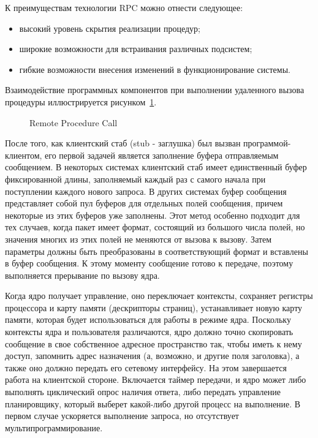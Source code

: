 К преимуществам технологии RPC
можно отнести следующее:
\begin{itemize}
  \item высокий уровень скрытия реализации процедур;
  \item широкие возможности для
встраивания различных подсистем;
\item гибкие возможности внесения изменений в
функционирование системы.
\end{itemize}

Взаимодействие программных компонентов при выполнении удаленного вызова
процедуры иллюстрируется рисунком~\ref{ris:3.4.1}. 

\begin{figure}[h!]
\center{\texttt{[image: 3-4-1]}}
\caption{Remote Procedure Call}
\label{ris:3.4.1}
\end{figure}

После того, как клиентский стаб (stub -
заглушка) был вызван программой-клиентом, его первой задачей является заполнение
буфера отправляемым сообщением. В некоторых системах клиентский стаб имеет
единственный буфер фиксированной длины, заполняемый каждый раз с самого начала
при поступлении каждого нового запроса. В других системах буфер сообщения
представляет собой пул буферов для отдельных полей сообщения, причем некоторые
из этих буферов уже заполнены. Этот метод особенно подходит для тех случаев,
когда пакет имеет формат, состоящий из большого числа полей, но значения многих
из этих полей не меняются от вызова к вызову.
Затем параметры должны быть преобразованы в соответствующий формат и вставлены в
буфер сообщения. К этому моменту сообщение готово к передаче, поэтому
выполняется прерывание по вызову ядра.

Когда ядро получает управление, оно переключает контексты, сохраняет регистры
процессора и карту памяти (дескрипторы страниц), устанавливает новую карту
памяти, которая будет использоваться для работы в режиме ядра. Поскольку
контексты ядра и пользователя различаются, ядро должно точно скопировать
сообщение в свое собственное адресное пространство так, чтобы иметь к нему
доступ, запомнить адрес назначения (а, возможно, и другие поля заголовка), а
также оно должно передать его сетевому интерфейсу. На этом завершается работа на
клиентской стороне. Включается таймер передачи, и ядро может либо выполнять
циклический опрос наличия ответа, либо передать управление планировщику, который
выберет какой-либо другой процесс на выполнение. В первом случае ускоряется
выполнение запроса, но отсутствует мультипрограммирование.

